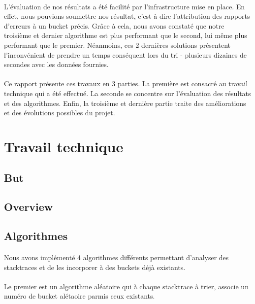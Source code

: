 \documentclass{article}
\begin{document}
\paragraph{}
L’évaluation de nos résultats a été facilité par l’infrastructure mise en place. En effet, nous pouvions soumettre nos résultat, c’est-à-dire l’attribution des rapports d’erreurs à un bucket précis. Grâce à cela, nous avons constaté que notre troisième et dernier algorithme est plus performant que le second, lui même plus performant que le premier. Néanmoins, ces 2 dernières solutions présentent l’inconvénient de prendre un temps conséquent lors du tri - plusieurs dizaines de secondes avec les données fournies.

\paragraph{}
Ce rapport présente ces travaux en 3 parties. La première est consacré au travail technique qui a été effectué. La seconde se concentre sur l'évaluation des résultats et des algorithmes. Enfin, la troisième et dernière partie traite des améliorations et des évolutions possibles du projet.

\newpage

\section{Travail technique}

\subsection{But}


\subsection{Overview}


\subsection{Algorithmes}

\paragraph{}
Nous avons implémenté 4 algorithmes différents permettant d'analyser des stacktraces et de les incorporer à des buckets déjà existants. 

\paragraph{}
Le premier est un algorithme aléatoire qui à chaque stacktrace à trier, associe un numéro de bucket alétaoire parmis ceux existants.
~~\\
\end{document}
